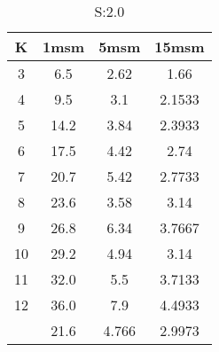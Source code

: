 \begin{table}[H]
\centering
\begin{tabular}{c|ccc}
K &1msm &5msm &15msm\\
\hline
3 & 6.5 & 2.62 & 1.66\\
4 & 9.5 & 3.1 & 2.1533\\
5 & 14.2 & 3.84 & 2.3933\\
6 & 17.5 & 4.42 & 2.74\\
7 & 20.7 & 5.42 & 2.7733\\
8 & 23.6 & 3.58 & 3.14\\
9 & 26.8 & 6.34 & 3.7667\\
10 & 29.2 & 4.94 & 3.14\\
11 & 32.0 & 5.5 & 3.7133\\
12 & 36.0 & 7.9 & 4.4933\\
\hline
& 21.6 & 4.766 & 2.9973\\
\end{tabular}
\caption{S:2.0}
\label{tab:s2.0}
\end{table}
